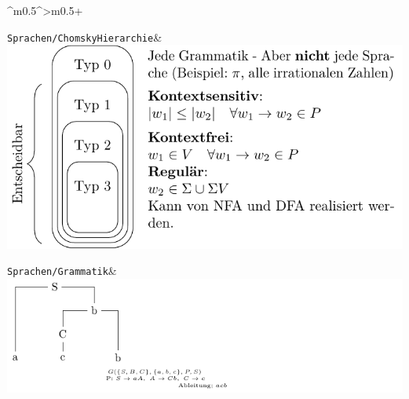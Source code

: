 \documentclass[PLAIN]{Lilly}
\begin{document}
\begin{tabularx}{\linewidth}{^m{0.5\linewidth}^>{\centering\arraybackslash}m{0.5\linewidth}+}
\midrule {} {}\verb|Sprachen/ChomskyHierarchie|& \includegraphics[width=0.8\linewidth]{Sprachen/ChomskyHierarchie-pdf.pdf}\\
\midrule {} {}\verb|Sprachen/Grammatik|& \includegraphics[width=0.8\linewidth]{Sprachen/Grammatik-pdf.pdf}\\
\midrule \bottomrule
\end{tabularx}
\end{document}
